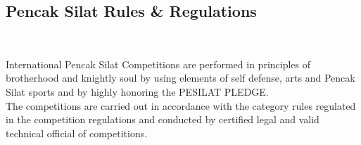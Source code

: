 
\begin{titlepage}
\chapter*{Pencak Silat Rules \& Regulations}
\begin{center}
    \begin{figure}[ht!]
    ~
\end{figure}
\end{center}

\noindent International Pencak Silat Competitions are performed in principles of brotherhood and knightly soul by using elements of self defense, arts and Pencak Silat sports and by highly honoring the PESILAT PLEDGE.\\

\noindent The competitions are carried out in accordance with the category rules regulated in the competition regulations and conducted by certified legal and valid technical official of competitions. \\


\end{titlepage}
